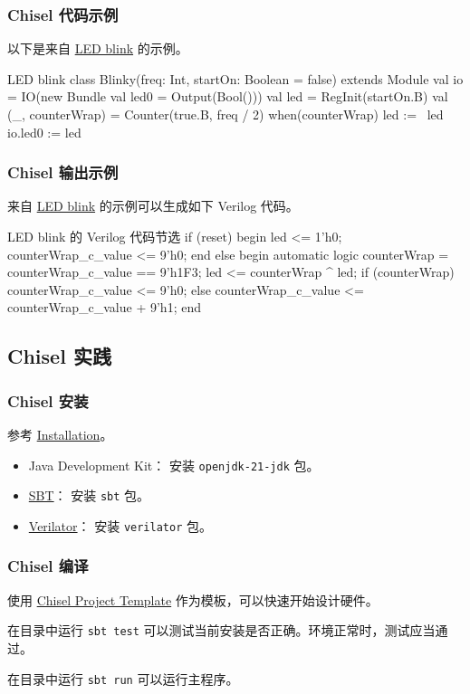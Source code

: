 \documentclass[xcolor=table,dvipsnames,svgnames,aspectratio=169]{ctexbeamer}
\begin{document}
\begin{frame}[fragile]
  \frametitle{Chisel 代码示例}
  以下是来自 \href{https://github.com/chipsalliance/chisel?tab=readme-ov-file#led-blink}{LED blink} 的示例。
  \begin{codeblock}[language=scala]{LED blink}
class Blinky(freq: Int, startOn: Boolean = false) extends Module {
    val io = IO(new Bundle {val led0 = Output(Bool())})
    val led = RegInit(startOn.B)
    val (_, counterWrap) = Counter(true.B, freq / 2)
    when(counterWrap) {
        led := ~led
      }
    io.led0 := led
  }
  \end{codeblock}
\end{frame}

\begin{frame}[fragile]
  \frametitle{Chisel 输出示例}
  来自 \href{https://github.com/chipsalliance/chisel?tab=readme-ov-file#led-blink}{LED blink} 的示例可以生成如下 Verilog 代码。
  \begin{codeblock}[language=verilog]{LED blink 的 Verilog 代码节选}
if (reset) begin led <= 1'h0; counterWrap_c_value <= 9'h0; end
else begin
automatic logic counterWrap = counterWrap_c_value == 9'h1F3; led <= counterWrap ^ led;
if (counterWrap) counterWrap_c_value <= 9'h0; else counterWrap_c_value <= counterWrap_c_value + 9'h1;
end
  \end{codeblock}
\end{frame}

\subsection{Chisel 实践}

\begin{frame}
  \frametitle{Chisel 安装}
  参考 \href{https://www.chisel-lang.org/docs/installation}{Installation}。
  \begin{itemize}
    \item Java Development Kit： 安装 \lstinline|openjdk-21-jdk| 包。
    \item \href{https://www.scala-sbt.org/}{SBT}： 安装 \lstinline|sbt| 包。
    \item \href{https://github.com/verilator/verilator/}{Verilator}： 安装 \lstinline|verilator| 包。
  \end{itemize}
\end{frame}

\begin{frame}
  \frametitle{Chisel 编译}
  使用 \href{https://github.com/freechipsproject/chisel-template}{Chisel Project Template} 作为模板，可以快速开始设计硬件。

  在目录中运行 \lstinline|sbt test| 可以测试当前安装是否正确。环境正常时，测试应当通过。

  在目录中运行 \lstinline|sbt run| 可以运行主程序。
\end{frame}
\end{document}
